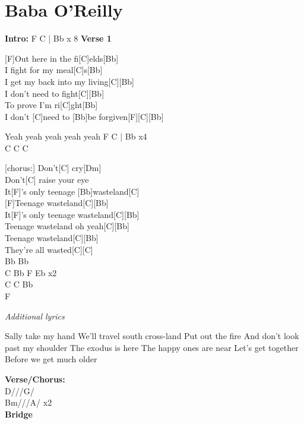 \documentclass{article}
\begin{document}
\section{Baba O'Reilly}

\begin{guitar}
\begin{multicols}{2}

  \textbf{Intro:}
  F  C  | Bb x 8
  \textbf{Verse 1}

  [F]Out here in the fi[C]elds[Bb]\\
  [F]I fight for my meal[C]s[Bb]\\
  [F]I get my back into my living[C][Bb]\\
  [F]I don't need to fight[C][Bb]\\
  [F]To prove I'm ri[C]ght[Bb]\\
  [F]I don't [C]need to [Bb]be forgiven[F][C][Bb]


Yeah yeah yeah yeah yeah
F   C  | Bb x4\\

C   C    C

    [chorus:]
Don't[C] cry[Dm]\\
Don't[C] raise your eye\\
It[F]'s only teenage [Bb]wasteland[C]\\

[F]Teenage wasteland[C][Bb]\\
It[F]'s only teenage wasteland[C][Bb]\\
[F]Teenage wasteland oh yeah[C][Bb]\\
[F]Teenage wasteland[C][Bb]\\
They're all wasted[C][C]\\

Bb Bb\\
C    Bb    F   Eb x2\\
C    C     Bb  \\
F\\


\end{multicols}

\begin{center}
\textit{Additional lyrics}

\end{center}

\begin{multicols}{2}\begin{flushleft}
[verse:]
Sally take my hand
We'll travel south cross-land
Put out the fire
And don't look past my shoulder
The exodus is here
The happy ones are near
Let's get together
Before we get much older

    \columnbreak
\end{flushleft}
\end{multicols}
\end{guitar}

\textbf{Verse/Chorus:}\\
D///G/\\
Bm///A/ x2\\
\textbf{Bridge}\\
\end{document}
